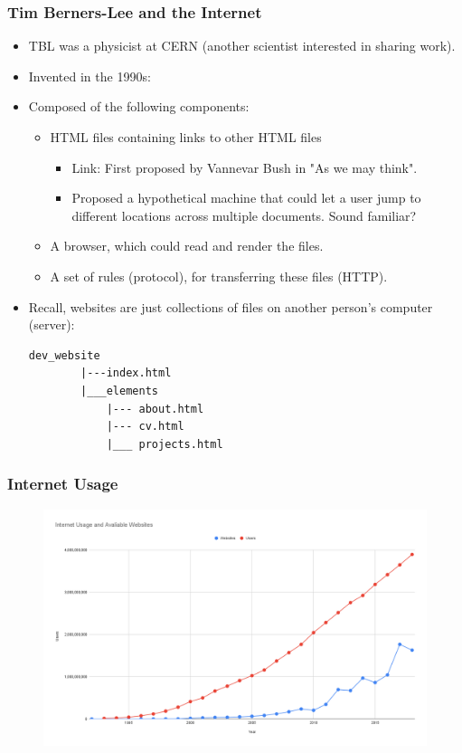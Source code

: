 \documentclass{beamer}
\begin{document}
%
%
\begin{frame}[fragile]
    \frametitle{Tim Berners-Lee and the Internet}
    \begin{itemize}
        \item TBL was a physicist at CERN (another scientist interested in sharing work).
        \item Invented in the 1990s:
        \item Composed of the following components:
            \begin{itemize}
                \pause
                \item HTML files containing links to other HTML files
                    \pause
                    \begin{itemize}
                        \item Link: First proposed by Vannevar Bush in "As we may think".
                        \item Proposed a hypothetical machine that could let a user jump to different locations across multiple documents. Sound familiar?
                    \end{itemize}
                \item A browser, which could read and render the files.
                    \pause
                \item A set of rules (protocol), for transferring these files (HTTP).
            \end{itemize}
        \item Recall, websites are just collections of files on another person's computer (server):
        \begin{lstlisting}[autogobble, basicstyle=\tiny]
        dev_website
        |---index.html
        |___elements
            |--- about.html
            |--- cv.html
            |___ projects.html
        \end{lstlisting} 

    \end{itemize}
\end{frame}

%
%
\begin{frame}[fragile]
    \frametitle{Internet Usage}
    \begin{figure}
        \includegraphics[width=\textswidth]{./imgs/chart.png}
    \end{figure}
\end{frame}
\end{document}
